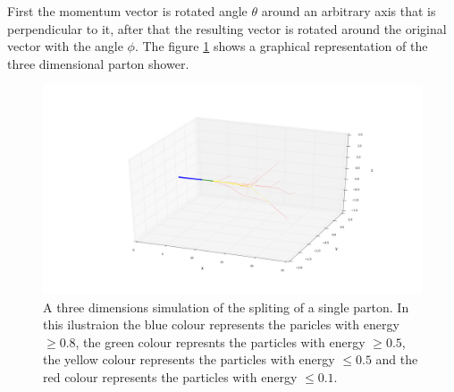 First the momentum vector is rotated angle $\theta$ around an arbitrary axis that is perpendicular to it, after that the resulting vector is rotated around the original vector with the angle $\phi$.
The figure \ref{fig:3dparton} shows a graphical representation of the three dimensional parton shower. 

%
%
% 
\begin{figure}[H]
\centering
\includegraphics[scale=.3]{images/3D_partonshower.png}
\caption{A three dimensions simulation of the spliting of a single parton. In this ilustraion the blue colour represents the paricles with energy $\geq 0.8$, the green colour represnts the particles with energy $\geq 0.5$, the yellow colour represents the particles with energy $\leq 0.5$ and the red colour represents the particles with energy $\leq 0.1$.}\label{fig:3dparton}
\end{figure}
%
